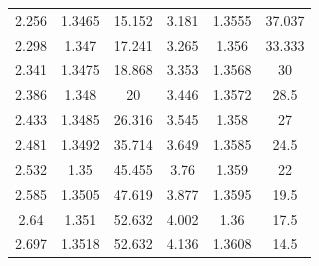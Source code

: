 \documentclass{book}
\begin{document}
\begin{table}[h]
\begin{tabular}{c c c | c c c}
2.256                     & 1.3465                   & 15.152                    & 3.181                     & 1.3555                   & 37.037                    \\
2.298                     & 1.347                    & 17.241                    & 3.265                     & 1.356                    & 33.333                    \\
2.341                     & 1.3475                   & 18.868                    & 3.353                     & 1.3568                   & 30                        \\
2.386                     & 1.348                    & 20                        & 3.446                     & 1.3572                   & 28.5                      \\
2.433                     & 1.3485                   & 26.316                    & 3.545                     & 1.358                    & 27                        \\
2.481                     & 1.3492                   & 35.714                    & 3.649                     & 1.3585                   & 24.5                      \\
2.532                     & 1.35                     & 45.455                    & 3.76                      & 1.359                    & 22                        \\
2.585                     & 1.3505                   & 47.619                    & 3.877                     & 1.3595                   & 19.5                      \\
2.64                      & 1.351                    & 52.632                    & 4.002                     & 1.36                     & 17.5                      \\
2.697                     & 1.3518                   & 52.632                    & 4.136                     & 1.3608                   & 14.5 \\

 \hline
\hline

\hline
\end{tabular}
\end{table}
\end{document}
